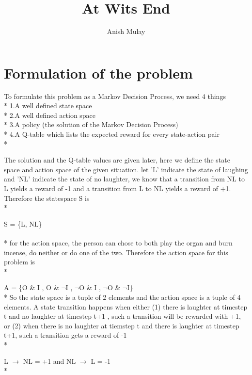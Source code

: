 \documentclass{article}
\title{At Wits End}
\author{Anish Mulay}
\begin{document}
\maketitle

\section{Formulation of the problem}
To formulate this problem as a Markov Decision Process, we need 4 things\\*
1.A well defined state space\\*
2.A well defined action space\\*
3.A policy (the solution of the Markov Decision Process)\\* 		
4.A Q-table which lists the expected reward for every state-action pair\\*

The solution and the Q-table values are given later, here we define the state space and action space of the given situation. 
let 'L' indicate the state of laughing and 'NL' indicate the state of no laughter, we know that a transition from NL to L yields a 
reward of -1 and a transition from L to NL yields a reward of +1. Therefore the statespace S is\\*

\vspace{5mm}
S = \{L, NL\}\\
\vspace{5mm}\\*
for the action space, the person can chose to both play the organ and burn incense, do neither or do one of the two. Therefore the action space for this problem is\\*

\vspace{5mm}
A = \{O \& I , O \&  $\neg$I , $\neg$O \& I , $\neg$O \& $\neg$I\}
\vspace{5mm}\\*
So the state space is a tuple of 2 elements and the action space is a tuple of 4 elements. A state transition happens when either (1) there is laughter at timestep
t and no laughter at timestep t+1 , such a transition will be rewarded with +1,  or (2) when there is no laughter at tiemstep t and there is laughter at timestep t+1, such a transition gets a reward of -1\\*

\vspace{5mm}
L $\rightarrow$ NL = +1 and 
NL $\rightarrow$ L = -1
\vspace{5mm}\\*
\end{document}

